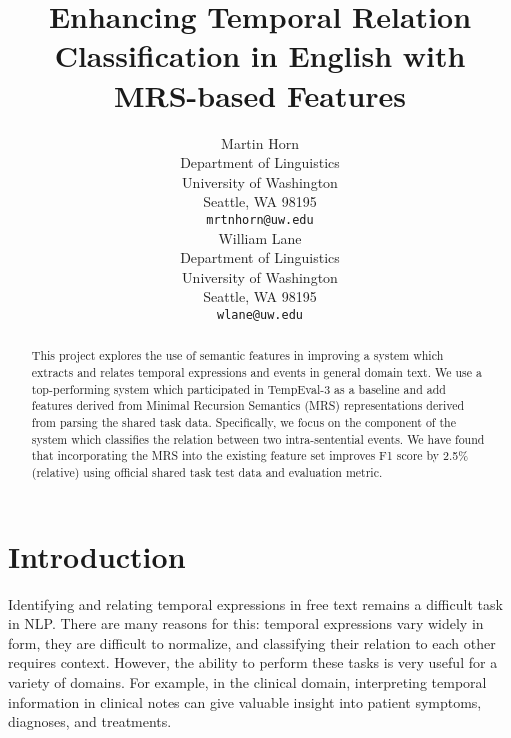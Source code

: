 \documentclass[11pt]{article}
\title{Enhancing Temporal Relation Classification in English with MRS-based Features}
\author{Martin Horn \\
  Department of Linguistics \\
  University of Washington \\
  Seattle, WA 98195 \\
  {\tt mrtnhorn@uw.edu} \\\And
  William Lane \\
  Department of Linguistics \\
  University of Washington \\
  Seattle, WA 98195 \\
  {\tt wlane@uw.edu} \\}
\date{}
\begin{document}
\maketitle
\begin{abstract}
This project explores the use of semantic features in improving a system which extracts and relates temporal expressions and events in general domain text. We use a top-performing system which participated in TempEval-3 as a baseline and add features derived from Minimal Recursion Semantics (MRS) representations derived from parsing the shared task data. Specifically, we focus on the component of the system which classifies the relation between two intra-sentential events. We have found that incorporating the MRS into the existing feature set improves F1 score by 2.5\% (relative) using official shared task test data and evaluation metric.
\end{abstract}

\section{Introduction}
\label{intro}

%
% 

Identifying and relating temporal expressions in free text remains a difficult task in NLP. There are many reasons for this: temporal expressions vary widely in form, they are difficult to normalize, and classifying their relation to each other requires context. However, the ability to perform these tasks is very useful for a variety of domains. For example, in the clinical domain, interpreting temporal information in clinical notes can give valuable insight into patient symptoms, diagnoses, and treatments.
\end{document}
